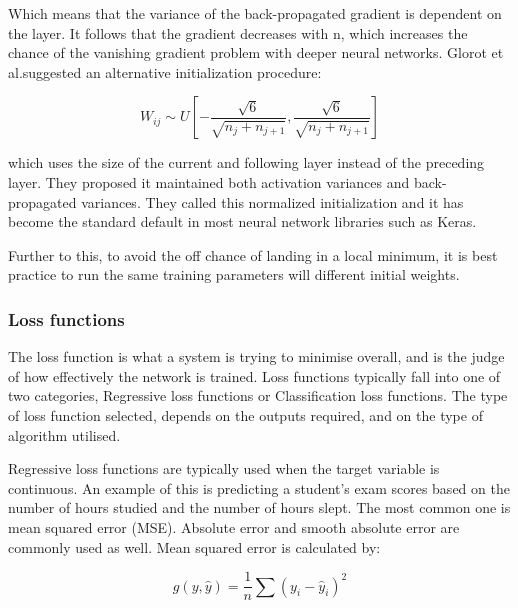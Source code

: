 Which means that the variance of the back-propagated gradient is dependent on the layer. It follows that the gradient decreases with n, which increases the chance of the vanishing gradient problem with deeper neural networks\cite{Glorot_difficulties}. Glorot et al.suggested an alternative initialization procedure:

\begin{equation}
    W_{ij} \sim U \left [  - \frac{\sqrt{6}}{\sqrt{n_j + n_{j+1}}}, \frac{\sqrt{6}}{\sqrt{n_j + n_{j+1}}} \right ]    \label{eqn:glorot2}
\end{equation}

which uses the size of the current and following layer instead of the preceding layer. They proposed it maintained both activation variances and back-propagated variances. They called this normalized initialization and it has become the standard default in most neural network libraries such as Keras\cite{chollet2015keras}.

Further to this, to avoid the off chance of landing in a local minimum, it is best practice to run the same training parameters will different initial weights\cite{LeCun_backprop}.


\subsubsection{Loss functions}\label{subsubsec:loss_func}

The loss function is what a system is trying to minimise overall, and is the judge of how effectively the network is trained. Loss functions typically fall into one of two categories, Regressive loss functions or Classification loss functions\cite{understand_ml}. The type of loss function selected, depends on the outputs required, and on the type of algorithm utilised.

Regressive loss functions are typically used when the target variable is continuous\cite{Nielsen_neuralnetworks}. An example of this is predicting a student's exam scores based on the number of hours studied and the number of hours slept. The most common one is mean squared error (MSE). Absolute error and smooth absolute error are commonly used as well. Mean squared error is calculated by:

\begin{equation}
    g\left ( y, \hat{y} \right )=\frac{1}{n}\sum{\left ( y_i - \hat{y}_i \right )^{2}}
\end{equation}

